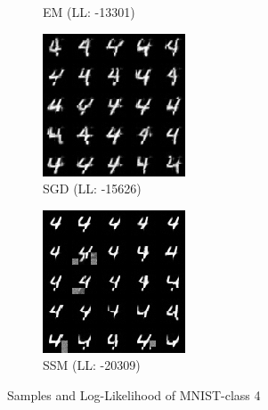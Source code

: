 \begin{figure}[H]
\begin{subfigure}[b]{0.24\textwidth}
        \caption{EM (LL: -13301)}
    \end{subfigure}
    \begin{subfigure}[b]{0.24\textwidth}
        \centering
        \includegraphics[width=\textwidth]{figures/einsum/mnist/[4]_SGD.png} 
        \caption{SGD (LL: -15626)}
    \end{subfigure}
    \begin{subfigure}[b]{0.24\textwidth}
        \centering
        \includegraphics[width=\textwidth]{figures/einsum/mnist/[4]_SSM.png}
        \caption{SSM (LL: -20309)}
    \end{subfigure}
    \caption{Samples and Log-Likelihood of MNIST-class 4}
\end{figure}

